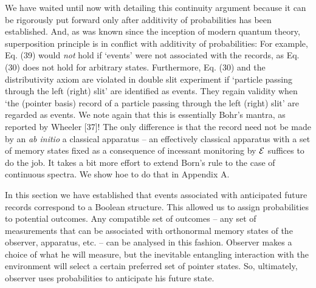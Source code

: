 \documentclass[aps,pra,epsfig,11pt,floatfix]{revtex4}
\begin{document}
We have waited until now with detailing this continuity argument because 
it can be rigorously put forward only after additivity of probabilities has been
established. And, as was known since the inception of modern quantum theory,
superposition principle is in conflict with additivity of probabilities:
For example, Eq. (39) would {\it not} hold if `events' were not associated with
the records, as Eq. (30) does not hold for arbitrary states.  Furthermore,
Eq. (30) and the distributivity axiom are violated in double slit experiment
if `particle passing through the left (right) slit' are identified as events.
They regain validity when `the (pointer basis) record of a particle passing
through the left (right) slit' are regarded as events. We note again that this is
essentially Bohr's mantra, as reported by Wheeler [37]! The only difference
is that the record need not be made by an {\it ab initio} a classical apparatus
-- an effectively classical apparatus with a set of memory states fixed as 
a consequence of incessant monitoring by ${\cal E}$ suffices to do the job.
It takes a bit more effort to extend Born's rule to the case of continuous spectra.
We show hoe to do that in Appendix A.

In this section we have established that events associated with anticipated
future records correspond to a Boolean structure. This allowed us to assign
probabilities to potential outcomes. Any compatible set of outcomes
-- any set of measurements that can be associated with orthonormal memory
states of the observer, apparatus, etc. -- can be analysed in this fashion.
Observer makes a choice of what he will measure, but the inevitable
entangling interaction with the environment will select a certain preferred set
of pointer states. So, ultimately, observer uses probabilities to anticipate
his future state.
\end{document}
